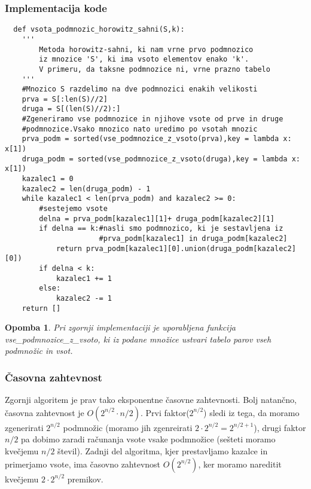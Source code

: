 \documentclass[12pt]{article}
\newtheorem{Opomba}[Izrek]{{\sc Opomba}}
\newenvironment{opomba}{\begin{Opomba}\rm}{\end{Opomba}}
\begin{document}
\newpage
 \subsubsection{Implementacija kode}
 \begin{lstlisting}
  def vsota_podmnozic_horowitz_sahni(S,k):
    '''
        Metoda horowitz-sahni, ki nam vrne prvo podmnozico 
        iz mnozice 'S', ki ima vsoto elementov enako 'k'. 
        V primeru, da taksne podmnozice ni, vrne prazno tabelo
    '''
    #Mnozico S razdelimo na dve podmnozici enakih velikosti
    prva = S[:len(S)//2]
    druga = S[(len(S)//2):]
    #Zgeneriramo vse podmnozice in njihove vsote od prve in druge
    #podmnozice.Vsako mnozico nato uredimo po vsotah mnozic
    prva_podm = sorted(vse_podmnozice_z_vsoto(prva),key = lambda x: x[1])
    druga_podm = sorted(vse_podmnozice_z_vsoto(druga),key = lambda x: x[1])
    kazalec1 = 0
    kazalec2 = len(druga_podm) - 1
    while kazalec1 < len(prva_podm) and kazalec2 >= 0:
        #sestejemo vsote
        delna = prva_podm[kazalec1][1]+ druga_podm[kazalec2][1] 
        if delna == k:#nasli smo podmnozico, ki je sestavljena iz
                      #prva_podm[kazalec1] in druga_podm[kazalec2]
            return prva_podm[kazalec1][0].union(druga_podm[kazalec2][0])
        if delna < k:
            kazalec1 += 1
        else:
            kazalec2 -= 1
    return []
\end{lstlisting}

\begin{opomba}
  Pri zgornji implementaciji je uporabljena funkcija \newline \textit{vse\_podmnozice\_z\_vsoto}, 
  ki iz podane množice ustvari tabelo parov vseh podmnožic in vsot.
\end{opomba}
\subsubsection{Časovna zahtevnost}
  Zgornji algoritem je prav tako eksponentne časovne zahtevnosti. Bolj natančno, časovna zahtevnost
  je $O(2^{n/2} \cdot n/2)$. Prvi faktor($2^{n/2}$) sledi iz tega, da moramo zgenerirati $2^{n/2}$ podmnožic
  (moramo jih zgenreirati $2 \cdot 2^{n/2} = 2^{n/2 + 1}$), drugi faktor $n/2$ pa dobimo zaradi računanja vsote vsake podmnožice
  (sešteti moramo kvečjemu $n/2$ števil). Zadnji del algoritma, kjer prestavljamo kazalce in primerjamo vsote, 
  ima časovno zahtevnost $O(2^{n/2})$, ker moramo nareditit kvečjemu $2 \cdot 2^{n/2}$ premikov. 
 \newline
\end{document}

